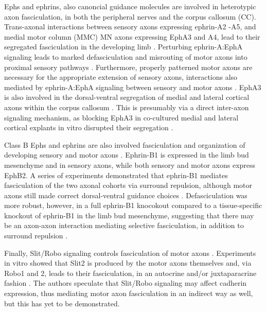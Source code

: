 Ephs and ephrins, also canoncial guidance molecules \cite{bashaw2010signaling,kolodkin2011mechanisms} are involved in heterotypic axon fasciculation, in both the peripheral nerves and the corpus callosum (CC).
Trans-axonal interactions between sensory axons expressing ephrin-A2 -A5, and medial motor column (MMC) MN axons expressing EphA3 and A4, lead to their segregated fasciculation in the developing limb \cite{gallarda2008segregation}.
Perturbing ephrin-A:EphA signaling leads to marked defasciculation and misrouting of motor axons into proximal sensory pathways \cite{gallarda2008segregation}.
Furthermore, properly patterned motor axons are necessary for the appropriate extension of sensory axons, interactions also mediated by ephrin-A:EphA signaling between sensory and motor axons \cite{wang2011anatomical}.
EphA3 is also involved in the dorsal-ventral segregation of medial and lateral cortical axons within the corpus callosum \cite{nishikimi2011segregation}.
This is presumably via a direct inter-axon signaling mechanism, as blocking EphA3 in co-cultured medial and lateral cortical explants in vitro disrupted their segregation \cite{nishikimi2011segregation}.

Class B Ephs and ephrins are also involved fasciculation and organization of developing sensory and motor axons \cite{luxey2013eph}.
Ephrin-B1 is expressed in the limb bud mesenchyme and in sensory axons, while both sensory and motor axons express EphB2.
A series of experiments demonstrated that ephrin-B1 mediates fasciculation of the two axonal cohorts via surround repulsion, although motor axons still made correct dorsal-ventral guidance choices \cite{luxey2013eph}.
Defasciculation was more robust, however, in a full ephrin-B1 knocokout compared to a tissue-specific knockout of ephrin-B1 in the limb bud mesenchyme, suggesting that there may be an axon-axon interaction mediating selective fasciculation, in addition to surround repulsion \cite{luxey2013eph}.

Finally, Slit/Robo signaling controls fasciculation of motor axons \cite{jaworski2012autocrine}.
Experiments in vitro showed that Slit2 is produced by the motor axons themselves and, via Robo1 and 2, leads to their fasciculation, in an autocrine and/or juxtaparacrine fashion \cite{jaworski2012autocrine}.
The authors speculate that Slit/Robo signaling may affect cadherin expression, thus mediating motor axon fasciculation in an indirect way as well, but this has yet to be demonstrated.